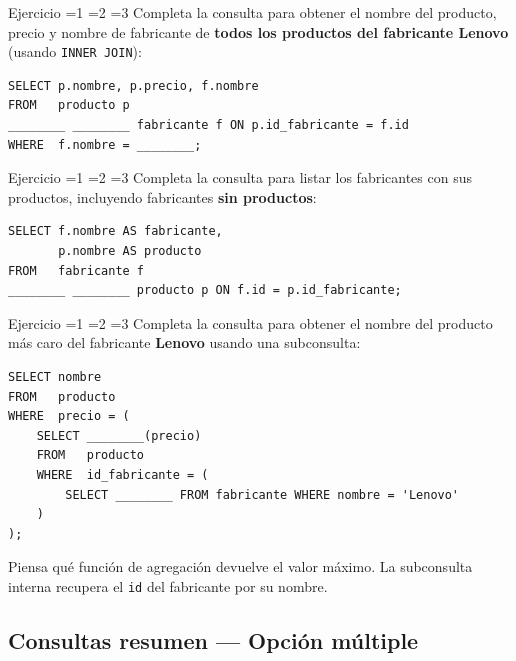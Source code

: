 \documentclass[12pt, a4paper]{article}
\newcommand{\estrella}{{\color{Goldenrod}\faStarSolid}}
\newcommand{\estrellavacia}{{\color{gray!45}\faStarSolid}}
\newcommand{\nivel}[1]{%
  \ifnum#1=1\estrella\estrellavacia\estrellavacia\fi
  \ifnum#1=2\estrella\estrella\estrellavacia\fi
  \ifnum#1=3\estrella\estrella\estrella\fi
}
\newcounter{numej}
\newcommand{\ej}{\stepcounter{numej}\thenumej}
\begin{document}
\begin{ejercicio}{Ejercicio \ej}{\nivel{2}}
Completa la consulta para obtener el nombre del producto, precio y
nombre de fabricante de \textbf{todos los productos del fabricante Lenovo}
(usando \texttt{INNER JOIN}):

\begin{lstlisting}
SELECT p.nombre, p.precio, f.nombre
FROM   producto p
________ ________ fabricante f ON p.id_fabricante = f.id
WHERE  f.nombre = ________;
\end{lstlisting}
\end{ejercicio}

\begin{ejercicio}{Ejercicio \ej}{\nivel{2}}
Completa la consulta para listar los fabricantes con sus productos,
incluyendo fabricantes \textbf{sin productos}:

\begin{lstlisting}
SELECT f.nombre AS fabricante,
       p.nombre AS producto
FROM   fabricante f
________ ________ producto p ON f.id = p.id_fabricante;
\end{lstlisting}
\end{ejercicio}

\begin{ejercicio}{Ejercicio \ej}{\nivel{3}}
Completa la consulta para obtener el nombre del producto más caro
del fabricante \textbf{Lenovo} usando una subconsulta:

\begin{lstlisting}
SELECT nombre
FROM   producto
WHERE  precio = (
    SELECT ________(precio)
    FROM   producto
    WHERE  id_fabricante = (
        SELECT ________ FROM fabricante WHERE nombre = 'Lenovo'
    )
);
\end{lstlisting}

\begin{hint}
Piensa qué función de agregación devuelve el valor máximo.
La subconsulta interna recupera el \texttt{id} del fabricante por su nombre.
\end{hint}
\end{ejercicio}

\subsection{Consultas resumen — Opción múltiple}
\end{document}

